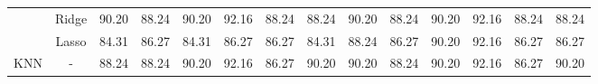 \begin{landscape}
\begin{table}[]
{\begin{tabular}{cc|cccccccccccc}
				& Ridge                                 & 90.20                                                             & 88.24                                                                & 90.20                                                                & 92.16                                                               & 88.24                                                            & \multicolumn{1}{c|}{88.24}                                                                   & 90.20                                                             & 88.24                                                                & 90.20                                                                & 92.16                                                               & 88.24                                                            & 88.24                                                                   \\
				& Lasso                                 & 84.31                                                             & 86.27                                                                & 84.31                                                                & 86.27                                                               & 86.27                                                            & \multicolumn{1}{c|}{84.31}                                                                   & 88.24                                                             & 86.27                                                                & 90.20                                                                & 92.16                                                               & 86.27                                                            & 86.27                                                                   \\ \hline
				KNN                             & -                                     & 88.24                                                             & 88.24                                                                & 90.20                                                                & 92.16                                                               & 86.27                                                            & \multicolumn{1}{c|}{90.20}                                                                   & 90.20                                                             & 88.24                                                                & 90.20                                                                & 92.16                                                               & 86.27                                                            & 90.20                                                                   \\ \hline

\end{tabular}}
\end{table}
\end{landscape}
